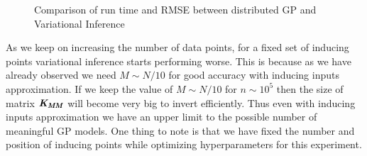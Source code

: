\begin{figure}[!ht]
  \centering
  \quad
  \caption{Comparison of run time and RMSE between distributed GP and Variational Inference}\label{fig:comparisonOfDGPvsVARGP}
\end{figure}

As we keep on increasing the number of data points, for a fixed set of inducing points variational inference starts performing worse. This is because as we have already observed we need $M \sim N/10$ for good accuracy with inducing inputs approximation. If we keep the value of $M \sim N/10$ for $n \sim 10^5$ then the size of matrix $\bm{\mathit{K_{MM}}}$ will become very big to invert efficiently. Thus even with inducing inputs approximation we have an upper limit to the possible number of meaningful GP models. One thing to note is that we have fixed the number and position of inducing points while optimizing hyperparameters for this experiment. 


